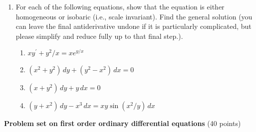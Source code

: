 \documentclass[fleqn]{article}
\begin{document}
\begin{enumerate}
    
    \item  For each of the following equations, show that the equation is either homogeneous or isobaric (i.e., scale invariant). Find the general solution (you can leave the final antiderivative undone if it is particularly complicated, but please simplify and reduce fully up to that final step.). 
    
    \begin{enumerate}
      \item $xy^{\prime }+y^{2}/x=xe^{y/x}$
      
      \item $\left( x^{2}+y^{2}\right) \,dy+\left( y^{2}-x^{2}\right) \,dx=0$
      
      \item $\left( x+y^{2}\right) \,dy+y\,dx=0$
      
      \item $\left( y+x^{2}\right) \,dy-x^{3}\,dx=xy \sin \left( x^{2}/y\right) \, dx$
    \end{enumerate}
  \end{enumerate}

  \pagebreak


  \textbf{Problem set on first order ordinary differential equations} (40 points)
\end{document}
